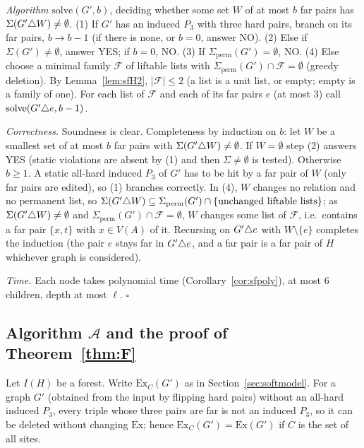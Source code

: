 \emph{Algorithm} $\mathrm{solve}(G',b)$, deciding whether some set $W$ of at most $b$ far pairs has $\Sigma(G'\triangle W)\ne\emptyset$.
(1) If $G'$ has an induced $P_3$ with three hard pairs, branch on its far pairs, $b\to b-1$ (if there is none, or $b=0$, answer NO).
(2) Else if $\Sigma(G')\ne\emptyset$, answer YES; if $b=0$, NO.
(3) If $\Sigma_{\mathrm{perm}}(G')=\emptyset$, NO.
(4) Else choose a minimal family $\mathcal F$ of liftable lists with $\Sigma_{\mathrm{perm}}(G')\cap\mathcal F=\emptyset$ (greedy deletion). By Lemma~\ref{lem:sfH2}, $|\mathcal F|\le2$ (a list is a unit list, or empty; empty is a family of one). For each list of $\mathcal F$ and each of its far pairs $e$ (at most $3$) call $\mathrm{solve}(G'\triangle e,b-1)$.

\emph{Correctness.} Soundness is clear. Completeness by induction on $b$: let $W$ be a smallest set of at most $b$ far pairs with $\Sigma(G'\triangle W)\ne\emptyset$. If $W=\emptyset$ step (2) answers YES (static violations are absent by (1) and then $\Sigma\ne\emptyset$ is tested). Otherwise $b\ge1$. A static all-hard induced $P_3$ of $G'$ has to be hit by a far pair of $W$ (only far pairs are edited), so (1) branches correctly. In (4), $W$ changes no relation and no permanent list, so $\Sigma(G'\triangle W)\subseteq\Sigma_{\mathrm{perm}}(G')\cap\{\text{unchanged liftable lists}\}$; as $\Sigma(G'\triangle W)\ne\emptyset$ and $\Sigma_{\mathrm{perm}}(G')\cap\mathcal F=\emptyset$, $W$ changes some list of $\mathcal F$, i.e.\ contains a far pair $\{x,t\}$ with $x\in V(A)$ of it. Recursing on $G'\triangle e$ with $W\setminus\{e\}$ completes the induction (the pair $e$ stays far in $G'\triangle e$, and a far pair is a far pair of $H$ whichever graph is considered).

\emph{Time.} Each node takes polynomial time (Corollary~\ref{cor:sfpoly}), at most $6$ children, depth at most $\ell$. \hfill$\square$

\subsection{Algorithm \texorpdfstring{$\mathcal A$}{A} and the proof of Theorem~\ref{thm:F}}\label{app:softF}
Let $I(H)$ be a forest. Write $\mathrm{Ex}_C(G')$ as in Section~\ref{sec:softmodel}. For a graph $G'$ (obtained from the input by flipping hard pairs) without an all-hard induced $P_3$, every triple whose three pairs are far is not an induced $P_3$, so it can be deleted without changing $\mathrm{Ex}$; hence $\mathrm{Ex}_C(G')=\mathrm{Ex}(G')$ if $C$ is the set of all sites.

